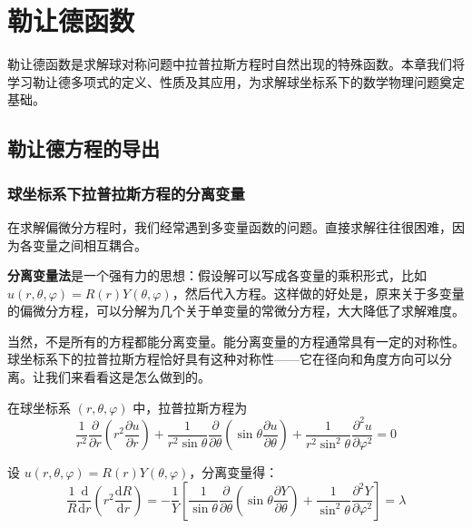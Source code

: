 
\chapter{勒让德函数}

\begin{wulibj}[本章导读]
勒让德函数是求解球对称问题中拉普拉斯方程时自然出现的特殊函数。本章我们将学习勒让德多项式的定义、性质及其应用，为求解球坐标系下的数学物理问题奠定基础。
\end{wulibj}

\section{勒让德方程的导出}

\subsection{球坐标系下拉普拉斯方程的分离变量}

在求解偏微分方程时，我们经常遇到多变量函数的问题。直接求解往往很困难，因为各变量之间相互耦合。

\textbf{分离变量法}是一个强有力的思想：假设解可以写成各变量的乘积形式，比如 $u(r, \theta, \varphi) = R(r)Y(\theta, \varphi)$，然后代入方程。这样做的好处是，原来关于多变量的偏微分方程，可以分解为几个关于单变量的常微分方程，大大降低了求解难度。

当然，不是所有的方程都能分离变量。能分离变量的方程通常具有一定的对称性。球坐标系下的拉普拉斯方程恰好具有这种对称性——它在径向和角度方向可以分离。让我们来看看这是怎么做到的。

在球坐标系 $(r, \theta, \varphi)$ 中，拉普拉斯方程为
\begin{equation}
    \frac{1}{r^2}\frac{\partial}{\partial r}\left(r^2\frac{\partial u}{\partial r}\right) + \frac{1}{r^2\sin\theta}\frac{\partial}{\partial\theta}\left(\sin\theta\frac{\partial u}{\partial\theta}\right) + \frac{1}{r^2\sin^2\theta}\frac{\partial^2 u}{\partial\varphi^2} = 0
\end{equation}

设 $u(r, \theta, \varphi) = R(r)Y(\theta, \varphi)$，分离变量得：
\begin{equation}
    \frac{1}{R}\frac{\mathrm{d}}{\mathrm{d}r}\left(r^2\frac{\mathrm{d}R}{\mathrm{d}r}\right) = -\frac{1}{Y}\left[\frac{1}{\sin\theta}\frac{\partial}{\partial\theta}\left(\sin\theta\frac{\partial Y}{\partial\theta}\right) + \frac{1}{\sin^2\theta}\frac{\partial^2 Y}{\partial\varphi^2}\right] = \lambda
\end{equation}

